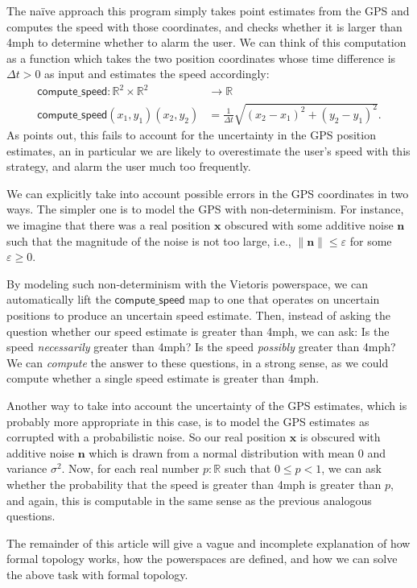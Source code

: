 \documentclass{article}           %
\newcommand{\R}{\mathbb{R}}
\newcommand{\ve}[1]{\mathbf{#1}}
\begin{document}
The naïve approach this program simply takes point estimates from the GPS and computes the speed with those coordinates, and checks whether it is larger than 4mph to determine whether to alarm the user. We can think of this computation as a function which takes the two position coordinates whose time difference is $\Delta t > 0$ as input and estimates the speed accordingly:
\begin{align*}
\mathsf{compute\_speed} : \R^2 \times \R^2 &\to \R
\\ \mathsf{compute\_speed} (x_1, y_1) (x_2, y_2) &= \frac{1}{\Delta t} \sqrt{(x_2 - x_1)^2 + (y_2 - y_1)^2}.
\end{align*}
As \cite{uncertaint} points out, this fails to account for the uncertainty in the GPS position estimates, an in particular we are likely to overestimate the user's speed with this strategy, and alarm the user much too frequently.

We can explicitly take into account possible errors in the GPS coordinates in two ways. The simpler one is to model the GPS with non-determinism. For instance, we imagine that there was a real position $\ve{x}$ obscured with some additive noise $\ve{n}$ such that the magnitude of the noise is not too large, i.e., $\| \ve{n} \| \le \varepsilon$ for some $\varepsilon \ge 0$.

By modeling such non-determinism with the Vietoris powerspace, we can automatically lift the $\mathsf{compute\_speed}$ map to one that operates on uncertain positions to produce an uncertain speed estimate. Then, instead of asking the question whether our speed estimate is greater than 4mph, we can ask: Is the speed \emph{necessarily} greater than 4mph? Is the speed \emph{possibly} greater than 4mph? We can \emph{compute} the answer to these questions, in a strong sense, as we could compute whether a single speed estimate is greater than 4mph.

Another way to take into account the uncertainty of the GPS estimates, which is probably more appropriate in this case, is to model the GPS estimates as corrupted with a probabilistic noise. So our real position $\ve{x}$ is obscured with additive noise $\ve{n}$ which is drawn from a normal distribution with mean 0 and variance $\sigma^2$. Now, for each real number $p : \R$ such that $0 \le p < 1$, we can ask whether the probability that the speed is greater than 4mph is greater than $p$, and again, this is computable in the same sense as the previous analogous questions.

The remainder of this article will give a vague and incomplete explanation of how formal topology works, how the powerspaces are defined, and how we can solve the above task with formal topology.
\end{document}
